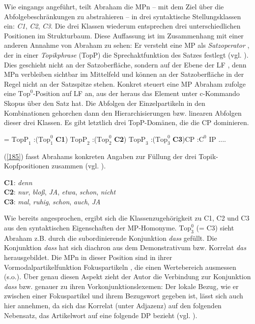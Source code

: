 Wie eingangs angeführt, teilt Abraham die MPn – mit dem Ziel über die Abfolgebeschränkungen zu abstrahieren – in drei syntaktische Stellungsklassen ein: \textit{C1}, \textit{C2}, \textit{C3}. Die drei Klassen wiederum entsprechen drei unterschiedlichen Positionen im Strukturbaum. Diese Auffassung ist im Zusammenhang mit einer anderen Annahme von Abraham zu sehen: Er versteht eine MP als \textit{Satzoperator} , der in einer \textit{Topikphrase}  (TopP) die Sprechaktfunktion des Satzes festlegt (vgl. \citealt[96-97]{Abraham1995}). Dies geschieht nicht an der Satzoberfläche, sondern auf der Ebene der LF , denn MPn verbleiben sichtbar im Mittelfeld und können an der Satzoberfläche in der Regel nicht an der Satzspitze stehen. Konkret steuert eine MP Abraham zufolge eine $\textrm{Top}^{0}$-Position auf LF an, aus der heraus das Element unter c-Kommando  Skopus über den Satz hat. Die Abfolgen der Einzelpartikeln in den Kombinationen gehorchen dann den Hierarchisierungen bzw. linearen Abfolgen dieser drei Klassen. Es gibt letztlich drei TopP-Domänen, die die CP dominieren.

\begin{exe}
	\ex\label{184}   
\begin{jtree}
\! = {$\textrm{TopP}_{1}$}
:({$\textrm{Top}^{0}_{1}$} {\textbf{C1}}) {$\textrm{TopP}_{2}$}
:({$\textrm{Top}^{0}_{2}$} {\textbf{C2}}) {$\textrm{TopP}_{3}$}
:({${\textrm{Top}^{0}_{3}}$} {\textbf{C3}}){CP}
:{$\textrm{C}^{0}$} {IP} {...}.
\end{jtree}
\end{exe}
(\ref{185}) fasst Abrahams konkreten Angaben zur Füllung der drei Topik-Kopfpositionen zusammen (vgl. \citeyear[103]{Abraham1995}).
	
\begin{exe}
	\ex\label{185}   
		\textbf{C1}: \textit{denn}\\
		\textbf{C2}: \textit{nur}, \textit{bloß}, \textit{JA}, \textit{etwa}, \textit{schon}, \textit{nicht}\\
		\textbf{C3}: \textit{mal}, \textit{ruhig}, \textit{schon}, \textit{auch}, \textit{JA}
\end{exe}	
Wie bereits angesprochen, ergibt sich die Klassenzugehörigkeit zu C1, C2 und C3 aus den syntaktischen Eigenschaften der  MP-Homonyme. $\textrm{Top}^{0}_{3}$ (= C3) sieht Abraham z.B. durch die subordinierende Konjunktion \textit{dass} gefüllt. Die Konjunktion \textit{dass} hat sich diachron  aus dem Demonstrativum bzw. Korrelat \textit{das} herausgebildet. Die MPn in dieser Position sind in ihrer Vormodalpartikelfunktion  Fokuspartikeln , die einen Wertebereich ausmessen (s.o.). Über genau diesen Aspekt zieht der Autor die Verbindung zur Konjunktion \textit{dass} bzw. genauer zu ihren Vorkonjunktionslexemen: Der lokale Bezug, wie er zwischen einer Fokuspartikel und ihrem Bezugswort gegeben ist, lässt sich auch hier annehmen, da sich das Kor\-relat  (unter Adjazenz) auf den folgenden Nebensatz, das Artikelwort auf eine folgende DP bezieht (vgl. \citealt[105-106]{Abraham1995}). 

